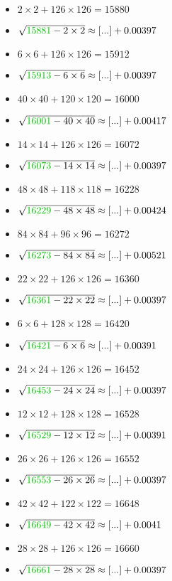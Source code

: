 \documentclass[12pt]{article}
\begin{document}
\begin{multicols}{2}
\begin{itemize}
\item $2\times2 + 126\times126 = 15880$
\item $\sqrt{ {\color{green!75!black}{15881}} - 2\times 2 } \approx [...] + 0.00397$
\item $6\times6 + 126\times126 = 15912$
\item $\sqrt{ {\color{green!75!black}{15913}} - 6\times 6 } \approx [...] + 0.00397$
\item $40\times40 + 120\times120 = 16000$
\item $\sqrt{ {\color{green!75!black}{16001}} - 40\times 40 } \approx [...] + 0.00417$
\item $14\times14 + 126\times126 = 16072$
\item $\sqrt{ {\color{green!75!black}{16073}} - 14\times 14 } \approx [...] + 0.00397$
\item $48\times48 + 118\times118 = 16228$
\item $\sqrt{ {\color{green!75!black}{16229}} - 48\times 48 } \approx [...] + 0.00424$
\item $84\times84 + 96\times96 = 16272$
\item $\sqrt{ {\color{green!75!black}{16273}} - 84\times 84 } \approx [...] + 0.00521$
\item $22\times22 + 126\times126 = 16360$
\item $\sqrt{ {\color{green!75!black}{16361}} - 22\times 22 } \approx [...] + 0.00397$
\item $6\times6 + 128\times128 = 16420$
\item $\sqrt{ {\color{green!75!black}{16421}} - 6\times 6 } \approx [...] + 0.00391$
\item $24\times24 + 126\times126 = 16452$
\item $\sqrt{ {\color{green!75!black}{16453}} - 24\times 24 } \approx [...] + 0.00397$
\item $12\times12 + 128\times128 = 16528$
\item $\sqrt{ {\color{green!75!black}{16529}} - 12\times 12 } \approx [...] + 0.00391$
\item $26\times26 + 126\times126 = 16552$
\item $\sqrt{ {\color{green!75!black}{16553}} - 26\times 26 } \approx [...] + 0.00397$
\item $42\times42 + 122\times122 = 16648$
\item $\sqrt{ {\color{green!75!black}{16649}} - 42\times 42 } \approx [...] + 0.0041$
\item $28\times28 + 126\times126 = 16660$
\item $\sqrt{ {\color{green!75!black}{16661}} - 28\times 28 } \approx [...] + 0.00397$

\end{itemize}
\end{multicols}
\end{document}
